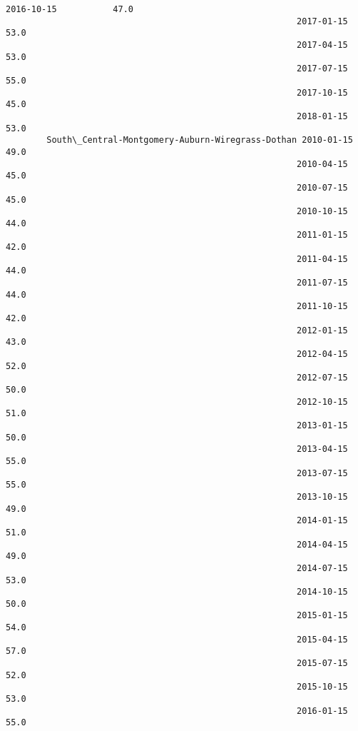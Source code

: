 \documentclass[11pt]{article}
\begin{document}
\begin{Verbatim}[commandchars=\\\{\}]
                                                         2016-10-15           47.0   
                                                         2017-01-15           53.0   
                                                         2017-04-15           53.0   
                                                         2017-07-15           55.0   
                                                         2017-10-15           45.0   
                                                         2018-01-15           53.0   
        South\_Central-Montgomery-Auburn-Wiregrass-Dothan 2010-01-15           49.0   
                                                         2010-04-15           45.0   
                                                         2010-07-15           45.0   
                                                         2010-10-15           44.0   
                                                         2011-01-15           42.0   
                                                         2011-04-15           44.0   
                                                         2011-07-15           44.0   
                                                         2011-10-15           42.0   
                                                         2012-01-15           43.0   
                                                         2012-04-15           52.0   
                                                         2012-07-15           50.0   
                                                         2012-10-15           51.0   
                                                         2013-01-15           50.0   
                                                         2013-04-15           55.0   
                                                         2013-07-15           55.0   
                                                         2013-10-15           49.0   
                                                         2014-01-15           51.0   
                                                         2014-04-15           49.0   
                                                         2014-07-15           53.0   
                                                         2014-10-15           50.0   
                                                         2015-01-15           54.0   
                                                         2015-04-15           57.0   
                                                         2015-07-15           52.0   
                                                         2015-10-15           53.0   
                                                         2016-01-15           55.0   

\end{Verbatim}
\end{document}
